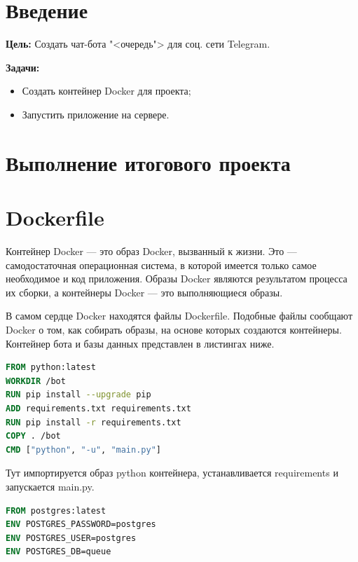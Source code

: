 \graphicspath{{./img/}}

\section*{\LARGE{Введение}}
\textbf{Цель:} Создать чат-бота "<очередь"> для соц. сети Telegram.

\textbf{Задачи:}
\begin{itemize}
	\item Создать контейнер Docker для проекта;
	\item Запустить приложение на сервере.
\end{itemize}

\clearpage

\section*{\LARGE{Выполнение итогового проекта}}

\section{Dockerfile}
Контейнер Docker --- это образ Docker, вызванный к жизни.
Это --- самодостаточная операционная система, в которой имеется только самое
необходимое и код приложения. Образы Docker являются результатом процесса
их сборки, а контейнеры Docker --- это выполняющиеся образы.\par
В самом сердце Docker находятся файлы Dockerfile.
Подобные файлы сообщают Docker о том, как собирать образы, на основе
которых создаются контейнеры. Контейнер бота и базы данных представлен
в листингах ниже.

\begin{lstlisting}[language=Dockerfile
	, caption=\leftline{Dockerfile бота}
	, label=lst:DF:bot
	, columns=flexible
	]
FROM python:latest
WORKDIR /bot
RUN pip install --upgrade pip
ADD requirements.txt requirements.txt
RUN pip install -r requirements.txt
COPY . /bot
CMD ["python", "-u", "main.py"]
\end{lstlisting}

Тут импортируется образ python контейнера, устанавливается requirements
и запускается main.py.

\begin{lstlisting}[language=Dockerfile
	, caption=\leftline{Dockerfile базы данных}
	, label=lst:DF:db
	, columns=flexible
	]
FROM postgres:latest
ENV POSTGRES_PASSWORD=postgres
ENV POSTGRES_USER=postgres
ENV POSTGRES_DB=queue
\end{lstlisting}

